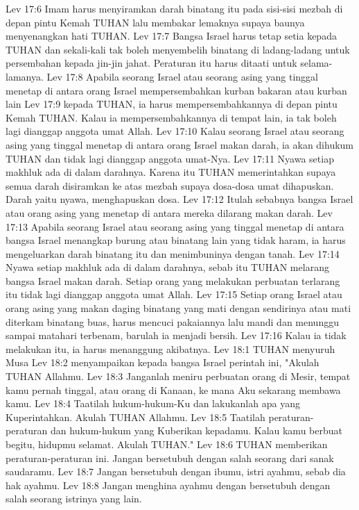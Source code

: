 Lev 17:6  Imam harus menyiramkan darah binatang itu pada sisi-sisi mezbah di depan pintu Kemah TUHAN lalu membakar lemaknya supaya baunya menyenangkan hati TUHAN.
Lev 17:7  Bangsa Israel harus tetap setia kepada TUHAN dan sekali-kali tak boleh menyembelih binatang di ladang-ladang untuk persembahan kepada jin-jin jahat. Peraturan itu harus ditaati untuk selama-lamanya.
Lev 17:8  Apabila seorang Israel atau seorang asing yang tinggal menetap di antara orang Israel mempersembahkan kurban bakaran atau kurban lain
Lev 17:9  kepada TUHAN, ia harus mempersembahkannya di depan pintu Kemah TUHAN. Kalau ia mempersembahkannya di tempat lain, ia tak boleh lagi dianggap anggota umat Allah.
Lev 17:10  Kalau seorang Israel atau seorang asing yang tinggal menetap di antara orang Israel makan darah, ia akan dihukum TUHAN dan tidak lagi dianggap anggota umat-Nya.
Lev 17:11  Nyawa setiap makhluk ada di dalam darahnya. Karena itu TUHAN memerintahkan supaya semua darah disiramkan ke atas mezbah supaya dosa-dosa umat dihapuskan. Darah yaitu nyawa, menghapuskan dosa.
Lev 17:12  Itulah sebabnya bangsa Israel atau orang asing yang menetap di antara mereka dilarang makan darah.
Lev 17:13  Apabila seorang Israel atau seorang asing yang tinggal menetap di antara bangsa Israel menangkap burung atau binatang lain yang tidak haram, ia harus mengeluarkan darah binatang itu dan menimbuninya dengan tanah.
Lev 17:14  Nyawa setiap makhluk ada di dalam darahnya, sebab itu TUHAN melarang bangsa Israel makan darah. Setiap orang yang melakukan perbuatan terlarang itu tidak lagi dianggap anggota umat Allah.
Lev 17:15  Setiap orang Israel atau orang asing yang makan daging binatang yang mati dengan sendirinya atau mati diterkam binatang buas, harus mencuci pakaiannya lalu mandi dan menunggu sampai matahari terbenam, barulah ia menjadi bersih.
Lev 17:16  Kalau ia tidak melakukan itu, ia harus menanggung akibatnya.
Lev 18:1  TUHAN menyuruh Musa
Lev 18:2  menyampaikan kepada bangsa Israel perintah ini, "Akulah TUHAN Allahmu.
Lev 18:3  Janganlah meniru perbuatan orang di Mesir, tempat kamu pernah tinggal, atau orang di Kanaan, ke mana Aku sekarang membawa kamu.
Lev 18:4  Taatilah hukum-hukum-Ku dan lakukanlah apa yang Kuperintahkan. Akulah TUHAN Allahmu.
Lev 18:5  Taatilah peraturan-peraturan dan hukum-hukum yang Kuberikan kepadamu. Kalau kamu berbuat begitu, hidupmu selamat. Akulah TUHAN."
Lev 18:6  TUHAN memberikan peraturan-peraturan ini. Jangan bersetubuh dengan salah seorang dari sanak saudaramu.
Lev 18:7  Jangan bersetubuh dengan ibumu, istri ayahmu, sebab dia hak ayahmu.
Lev 18:8  Jangan menghina ayahmu dengan bersetubuh dengan salah seorang istrinya yang lain.
